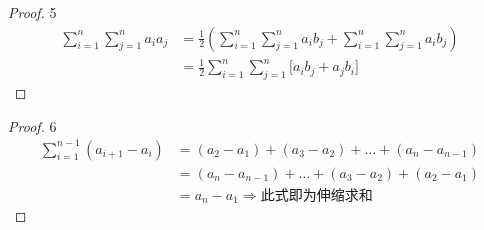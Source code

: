 \begin{proof}\num{5}
\begin{align}
\sum_{i=1}^{n}{\sum_{j=1}^{n}{a_i a_j}}
&=\frac{1}{2}\left(\sum_{{i}=1}^{{n}} \sum_{{j}=1}^{{n}} a_{{i}} {b}_{{j}}+\sum_{{i}=1}^{{n}} \sum_{{j}=1}^{{n}} a_{{i}} {b}_{{j}}\right) \nonumber\\
&=\frac{1}{2} \sum_{{i}=1}^{{n}} \sum_{{j}=1}^{{n}}\biggl[a_{{i}} {b}_{{j}}+a_{{j}} {b}_{{i}}\biggr]\nonumber
\end{align}
\end{proof}

\begin{proof}\num{6}
\begin{align*}
    \sum_{i=1}^{n-1}\left(a_{i+1}-a_{i}\right)
    &=\left(a_{2}-a_{1}\right)+\left(a_{3}-a_{2}\right)+\ldots+\left(a_{n}-a_{n-1}\right) \\
    &=\left(a_{n}-a_{n-1}\right)+\ldots+\left(a_{3}-a_{2}\right)+\left(a_{2}-a_{1}\right) \\
    &=a_{n}-a_{1}
    \Longrightarrow\mbox{此式即为伸缩求和}
\end{align*}
\end{proof}
\clearpage


